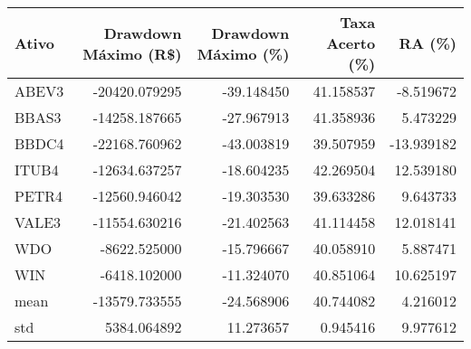 \begin{tabular}{lrrrr}
\toprule
Ativo &  Drawdown Máximo (R\$) &  Drawdown Máximo (\%)  &      Taxa Acerto (\%) &  RA (\%) \\
\midrule
     ABEV3 &     -20420.079295 &                   -39.148450 & 41.158537 &           -8.519672 \\
     BBAS3 &     -14258.187665 &                   -27.967913 & 41.358936 &            5.473229 \\
     BBDC4 &     -22168.760962 &                   -43.003819 & 39.507959 &          -13.939182 \\
     ITUB4 &     -12634.637257 &                   -18.604235 & 42.269504 &           12.539180 \\
     PETR4 &     -12560.946042 &                   -19.303530 & 39.633286 &            9.643733 \\
     VALE3 &     -11554.630216 &                   -21.402563 & 41.114458 &           12.018141 \\
       WDO &      -8622.525000 &                   -15.796667 & 40.058910 &            5.887471 \\
       WIN &      -6418.102000 &                   -11.324070 & 40.851064 &           10.625197 \\
      mean &     -13579.733555 &                   -24.568906 & 40.744082 &            4.216012 \\
       std &       5384.064892 &                    11.273657 &  0.945416 &            9.977612 \\
\bottomrule
\end{tabular}
